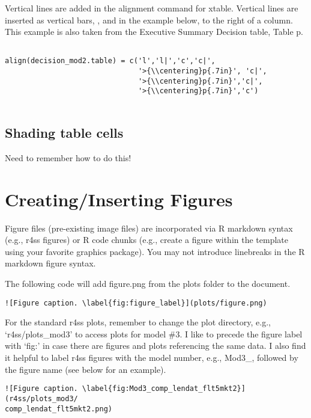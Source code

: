\documentclass[12pt,]{article}
\begin{document}
Vertical lines are added in the alignment command for xtable. Vertical
lines are inserted as vertical bars, \textbar{}, and in the example
below, to the right of a column. This example is also taken from the
Executive Summary Decision table, Table p.

\begin{Verbatim}[frame=single]

align(decision_mod2.table) = c('l','l|','c','c|',
                               '>{\\centering}p{.7in}', 'c|',
                               '>{\\centering}p{.7in}','c|',
                               '>{\\centering}p{.7in}','c') 
                               
\end{Verbatim}

\subsection{Shading table cells}\label{shading-table-cells}

Need to remember how to do this!

\section{Creating/Inserting Figures}\label{creatinginserting-figures}

Figure files (pre-existing image files) are incorporated via R markdown
syntax (e.g., r4ss figures) or R code chunks (e.g., create a figure
within the template using your favorite graphics package). You may not
introduce linebreaks in the R markdown figure syntax.

The following code will add figure.png from the plots folder to the
document.

\begin{Verbatim}[frame=single]
![Figure caption. \label{fig:figure_label}](plots/figure.png)
\end{Verbatim}

For the standard r4ss plots, remember to change the plot directory,
e.g., `r4ss/plots\_mod3' to access plots for model \#3. I like to
precede the figure label with `fig:' in case there are figures and plots
referencing the same data. I also find it helpful to label r4ss figures
with the model number, e.g., Mod3\_, followed by the figure name (see
below for an example).

\begin{Verbatim}[frame=single]
![Figure caption. \label{fig:Mod3_comp_lendat_flt5mkt2}](r4ss/plots_mod3/
comp_lendat_flt5mkt2.png)
\end{Verbatim}
\end{document}
